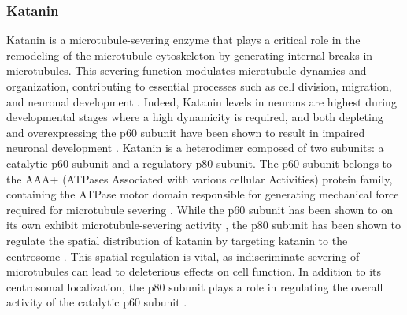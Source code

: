 \subsubsection{Katanin}
\label{sec:katanin_intro}
Katanin is a microtubule-severing enzyme that plays a critical role in the remodeling of the microtubule cytoskeleton by generating internal breaks in microtubules. This severing function modulates microtubule dynamics and organization, contributing to essential processes such as cell division, migration, and neuronal development \parencite{ROLLMECAK201096, Lombino2019}. Indeed, Katanin levels in neurons are highest during developmental stages where a high dynamicity is required, and both depleting and overexpressing the p60 subunit have been shown to result in impaired neuronal development \parencite{Karabay2004}. Katanin is a heterodimer composed of two subunits: a catalytic p60 subunit and a regulatory p80 subunit. The p60 subunit belongs to the AAA+ (ATPases Associated with various cellular Activities) protein family, containing the ATPase motor domain responsible for generating mechanical force required for microtubule severing \parencite{Johjima2015, McNally2014}. While the p60 subunit has been shown to on its own exhibit microtubule-severing activity \parencite{McNally2014}, the p80 subunit has been shown to regulate the spatial distribution of katanin by targeting katanin to the centrosome \parencite{Hartman1998}. This spatial regulation is vital, as indiscriminate severing of microtubules can lead to deleterious effects on cell function. In addition to its centrosomal localization, the p80 subunit plays a role in regulating the overall activity of the catalytic p60 subunit \parencite{McNally2000}. \par

